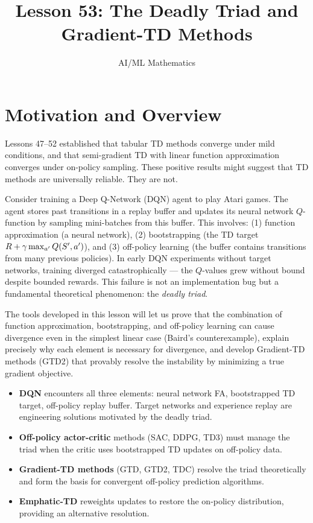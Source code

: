 \documentclass[11pt,a4paper]{article}
\title{Lesson 53: The Deadly Triad and Gradient-TD Methods}
\author{AI/ML Mathematics}
\date{}
\begin{document}
\maketitle
\tableofcontents
\newpage

\section{Motivation and Overview}
\label{sec:motivation}

Lessons 47--52 established that tabular TD methods converge under mild
conditions, and that semi-gradient TD with linear function approximation
converges under on-policy sampling. These positive results might suggest
that TD methods are universally reliable. They are not.

Consider training a Deep Q-Network (DQN) agent to play Atari games. The
agent stores past transitions in a replay buffer and updates its neural
network $Q$-function by sampling mini-batches from this buffer. This
involves: (1) function approximation (a neural network), (2)
bootstrapping (the TD target $R + \gamma \max_{a'} Q(S', a')$), and
(3) off-policy learning (the buffer contains transitions from many
previous policies). In early DQN experiments without target networks,
training diverged catastrophically --- the $Q$-values grew without bound
despite bounded rewards. This failure is not an implementation bug but a
fundamental theoretical phenomenon: the \emph{deadly triad}.

The tools developed in this lesson will let us prove that the
combination of function approximation, bootstrapping, and off-policy
learning can cause divergence even in the simplest linear case
(Baird's counterexample), explain precisely why each element is
necessary for divergence, and develop Gradient-TD methods (GTD2)
that provably resolve the instability by minimizing a true gradient
objective.

\begin{rlconnection}[title={Where the Deadly Triad Appears}]
\begin{itemize}[nosep]
  \item \textbf{DQN} encounters all three elements: neural network FA,
    bootstrapped TD target, off-policy replay buffer. Target networks
    and experience replay are engineering solutions motivated by the
    deadly triad.
  \item \textbf{Off-policy actor-critic} methods (SAC, DDPG, TD3) must
    manage the triad when the critic uses bootstrapped TD updates on
    off-policy data.
  \item \textbf{Gradient-TD methods} (GTD, GTD2, TDC) resolve the
    triad theoretically and form the basis for convergent off-policy
    prediction algorithms.
  \item \textbf{Emphatic-TD} reweights updates to restore the on-policy
    distribution, providing an alternative resolution.
\end{itemize}
\end{rlconnection}
\end{document}
